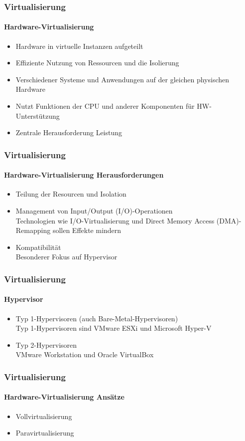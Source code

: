 \begin{frame}
  \frametitle{Virtualisierung}
  \framesubtitle{Hardware-Virtualisierung }
  \begin{itemize}
    \item Hardware in virtuelle Instanzen aufgeteilt
    \item Effiziente Nutzung von Ressourcen und die Isolierung
    \item Verschiedener Systeme und Anwendungen auf der gleichen physischen Hardware
    \item Nutzt Funktionen der CPU und anderer Komponenten für HW-Unterstützung
    \item Zentrale Herausforderung Leistung
  \end{itemize}
\end{frame}


\begin{frame}
  \frametitle{Virtualisierung}
  \framesubtitle{Hardware-Virtualisierung Herausforderungen}
  \begin{itemize}
    \item Teilung der Resourcen und Isolation
    \item Management von Input/Output (I/O)-Operationen\\Technologien wie I/O-Virtualisierung und Direct Memory Access (DMA)-Remapping sollen Effekte mindern
    \item Kompatibilität\\
    Besonderer Fokus auf Hypervisor
  \end{itemize}
\end{frame}


\begin{frame}
  \frametitle{Virtualisierung}
  \framesubtitle{Hypervisor}
  \begin{itemize}
    \item Typ 1-Hypervisoren (auch Bare-Metal-Hypervisoren)\\ 
    Typ 1-Hypervisoren sind VMware ESXi und Microsoft Hyper-V
    \item Typ 2-Hypervisoren \\
    VMware Workstation und Oracle VirtualBox
  \end{itemize}
\end{frame}

\begin{frame}
  \frametitle{Virtualisierung}
  \framesubtitle{Hardware-Virtualisierung Ansätze}
  \begin{itemize}
    \item Vollvirtualisierung 
    \item Paravirtualisierung
  \end{itemize}
\end{frame}

